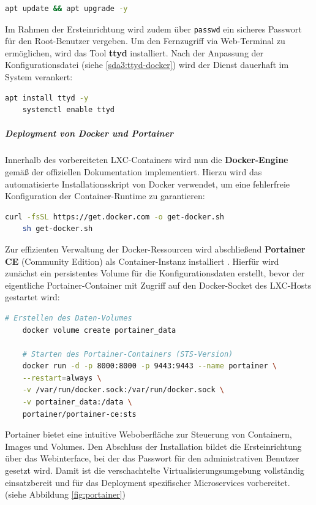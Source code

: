 \documentclass[11pt,
a4paper,
numbers=nonperiod,
footsepline,
oneside,
numbers=noenddot,
bibliography=totoc
]{scrartcl}
\begin{document}
\begin{lstlisting}[language=bash]
	apt update && apt upgrade -y
\end{lstlisting}
\bigskip
Im Rahmen der Ersteinrichtung wird zudem über \texttt{passwd} ein sicheres Passwort für den Root-Benutzer vergeben. Um den Fernzugriff via Web-Terminal zu ermöglichen, wird das Tool \textbf{ttyd} installiert. Nach der Anpassung der Konfigurationsdatei (siehe \ref{sda3:ttyd-docker}) wird der Dienst dauerhaft im System verankert:

\begin{lstlisting}[language=bash]
	apt install ttyd -y
	systemctl enable ttyd
\end{lstlisting}

\subparagraph{Deployment von Docker und Portainer}
Innerhalb des vorbereiteten LXC-Containers wird nun die \textbf{Docker-Engine} gemäß der offiziellen Dokumentation \cite{docker_install} implementiert. Hierzu wird das automatisierte Installationsskript von Docker verwendet, um eine fehlerfreie Konfiguration der Container-Runtime zu garantieren:

\begin{lstlisting}[language=bash]
	curl -fsSL https://get.docker.com -o get-docker.sh
	sh get-docker.sh
\end{lstlisting}
\newpage
Zur effizienten Verwaltung der Docker-Ressourcen wird abschließend \textbf{Portainer CE} (Community Edition) als Container-Instanz installiert \cite{portainer_install}. Hierfür wird zunächst ein persistentes Volume für die Konfigurationsdaten erstellt, bevor der eigentliche Portainer-Container mit Zugriff auf den Docker-Socket des LXC-Hosts gestartet wird:

\begin{lstlisting}[language=bash]
	# Erstellen des Daten-Volumes
	docker volume create portainer_data
	
	# Starten des Portainer-Containers (STS-Version)
	docker run -d -p 8000:8000 -p 9443:9443 --name portainer \
	--restart=always \
	-v /var/run/docker.sock:/var/run/docker.sock \
	-v portainer_data:/data \
	portainer/portainer-ce:sts
\end{lstlisting}
\bigskip
Portainer bietet eine intuitive Weboberfläche zur Steuerung von Containern, Images und Volumes. Den Abschluss der Installation bildet die Ersteinrichtung über das Webinterface, bei der das Passwort für den administrativen Benutzer gesetzt wird. Damit ist die verschachtelte Virtualisierungsumgebung vollständig einsatzbereit und für das Deployment spezifischer Microservices vorbereitet. (siehe Abbildung \ref{fig:portainer})
\end{document}
